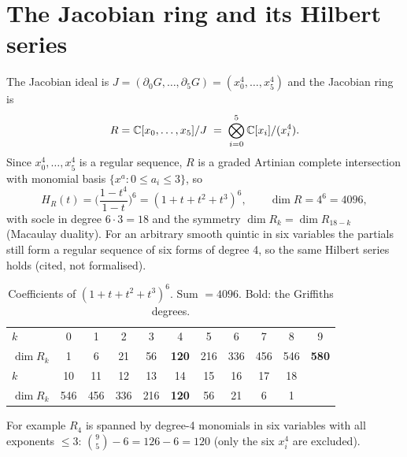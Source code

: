 \documentclass[11pt]{article}
\theoremstyle{definition}\newtheorem{definition}[theorem]{Definition}\newtheorem{remark}[theorem]{Remark}
\begin{document}
\section{The Jacobian ring and its Hilbert series}\label{sec:jac}
The Jacobian ideal is $J=(\partial_0G,\dots,\partial_5G)=(x_0^4,\dots,x_5^4)$ and the Jacobian ring is
\[ R=\mathbb{C}[x_0,\dots,x_5]/J \;=\;\bigotimes_{i=0}^5 \mathbb{C}[x_i]/(x_i^4). \]
Since $x_0^4,\dots,x_5^4$ is a regular sequence, $R$ is a graded Artinian complete intersection with monomial
basis $\{x^a: 0\le a_i\le3\}$, so
\[ H_R(t)=\Big(\frac{1-t^4}{1-t}\Big)^6=(1+t+t^2+t^3)^6,\qquad \dim R=4^6=4096, \]
with socle in degree $6\cdot 3=18$ and the symmetry $\dim R_k=\dim R_{18-k}$ (Macaulay duality).
For an arbitrary smooth quintic in six variables the partials still form a regular sequence of six forms
of degree 4, so the same Hilbert series holds (cited, not formalised).
\begin{table}[h]\centering\small
\begin{tabular}{l*{10}{c}}\toprule
$k$ & 0&1&2&3&4&5&6&7&8&9\\
$\dim R_k$ & 1&6&21&56&\textbf{120}&216&336&456&546&\textbf{580}\\\midrule
$k$ & 10&11&12&13&14&15&16&17&18&\\
$\dim R_k$ & 546&456&336&216&\textbf{120}&56&21&6&1&\\\bottomrule
\end{tabular}
\caption{Coefficients of $(1+t+t^2+t^3)^6$. Sum $=4096$. Bold: the Griffiths degrees.}\label{tab:series}
\end{table}
For example $R_4$ is spanned by degree-4 monomials in six variables with all exponents $\le 3$:
$\binom{9}{5}-6=126-6=120$ (only the six $x_i^4$ are excluded).
\end{document}
